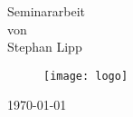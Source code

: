 \begin{titlepage}
	
	{\large Seminararbeit}\\[1.5mm]
	von\\[1.5mm]
	{\large Stephan Lipp}
	
	
	\vfill\vfill\vfill %

	\begin{figure}[!h]
		\centering
		\texttt{[image: logo]}
	\end{figure}
	
	\vfill

	{\large\today} %
	
	
	 
	
	\vfill %
	
\end{titlepage}
